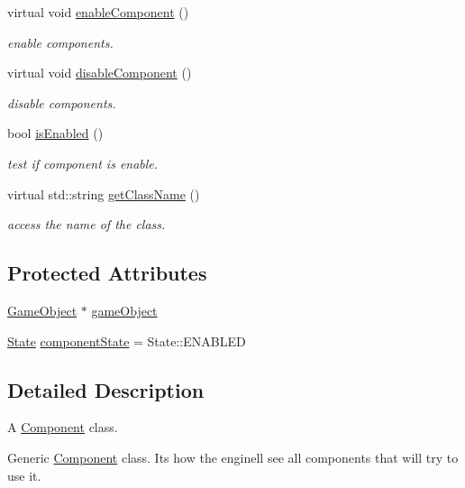 \begin{DoxyCompactItemize}
virtual void \hyperlink{classengine_1_1_component_ae4e0b2575af124b63c7c5c15765c3add}{enable\+Component} ()
\begin{DoxyCompactList}\small\item\em enable components. \end{DoxyCompactList}\item 
virtual void \hyperlink{classengine_1_1_component_a9c42e55639174abeda044285a8b1db4b}{disable\+Component} ()
\begin{DoxyCompactList}\small\item\em disable components. \end{DoxyCompactList}\item 
bool \hyperlink{classengine_1_1_component_aa22ebfe0829ab3f1609fd139ddd0ff54}{is\+Enabled} ()
\begin{DoxyCompactList}\small\item\em test if component is enable. \end{DoxyCompactList}\item 
virtual std\+::string \hyperlink{classengine_1_1_component_a4341ed3c744b160590908bea151b6ca7}{get\+Class\+Name} ()
\begin{DoxyCompactList}\small\item\em access the name of the class. \end{DoxyCompactList}\end{DoxyCompactItemize}
\subsection*{Protected Attributes}
\begin{DoxyCompactItemize}
\item 
\hyperlink{classengine_1_1_game_object}{Game\+Object} $\ast$ \hyperlink{classengine_1_1_component_ad4a4865ca4df98ebea34d04a4ec5ad07}{game\+Object}
\item 
\hyperlink{namespaceengine_aa1fd544a3408d033764aa448ec42c912}{State} \hyperlink{classengine_1_1_component_acd64e7e69db92dbdafe70d208dc1c85e}{component\+State} = State\+::\+E\+N\+A\+B\+L\+ED
\end{DoxyCompactItemize}


\subsection{Detailed Description}
A \hyperlink{classengine_1_1_component}{Component} class. 

Generic \hyperlink{classengine_1_1_component}{Component} class. It\textquotesingle{}s how the engine\textquotesingle{}ll see all components that will try to use it. 

